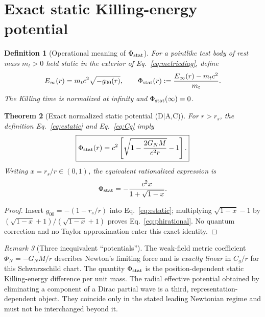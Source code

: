 \documentclass[11pt,a4paper]{article}
\newtheorem{theorem}{Theorem}[section]
\newtheorem{definition}[theorem]{Definition}
\theoremstyle{remark}
\newtheorem{remark}[theorem]{Remark}
\newcommand{\eref}[1]{Eq.~\eqref{#1}}
\begin{document}
\section{Exact static Killing-energy potential}\label{sec:potential}
\begin{definition}[Operational meaning of $\Phi_{\rm stat}$]
For a pointlike test body of rest mass $m_t>0$ \emph{held static} in the exterior of \eref{eq:metricdiag}, define
\begin{equation}\label{eq:estatic}
 E_\infty(r)=m_tc^2\sqrt{-g_{00}(r)},\qquad
 \Phi_{\rm stat}(r):=\frac{E_\infty(r)-m_tc^2}{m_t}.
\end{equation}
The Killing time is normalized at infinity and $\Phi_{\rm stat}(\infty)=0$.
\end{definition}
\begin{theorem}[Exact normalized static potential (D$\mid$A,C)]\label{thm:potential}
For $r>r_s$, the definition \eref{eq:estatic} and \eref{eq:Cg} imply
\begin{equation}\label{eq:exactphi}
\boxed{\Phi_{\rm stat}(r)=c^2\left[\sqrt{1-\frac{2G_NM}{c^2r}}-1\right].}
\end{equation}
Writing $x=r_s/r\in(0,1)$, the equivalent rationalized expression is
\begin{equation}\label{eq:phirational}
\Phi_{\rm stat}=-\frac{c^2x}{1+\sqrt{1-x}}.
\end{equation}
\end{theorem}
\begin{proof}
Insert $g_{00}=-(1-r_s/r)$ into \eref{eq:estatic}; multiplying $\sqrt{1-x}-1$ by $(\sqrt{1-x}+1)/(\sqrt{1-x}+1)$ proves \eref{eq:phirational}. No quantum correction and no Taylor approximation enter this exact identity.
\end{proof}
\begin{remark}[Three inequivalent ``potentials'']
The weak-field metric coefficient $\Phi_N=-G_NM/r$ describes Newton's limiting force and is \emph{exactly linear} in $C_g/r$ for this Schwarzschild chart. The quantity $\Phi_{\rm stat}$ is the position-dependent static Killing-energy difference per unit mass. The radial effective potential obtained by eliminating a component of a Dirac partial wave is a third, representation-dependent object. They coincide only in the stated leading Newtonian regime and must not be interchanged beyond it.
\end{remark}
\end{document}
